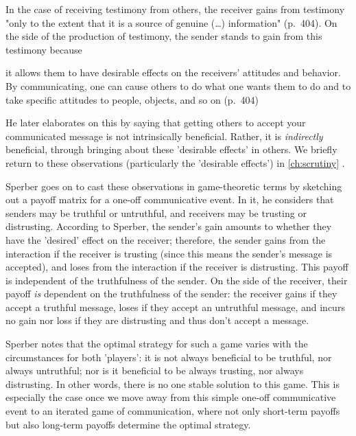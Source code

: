 In the case of receiving testimony from others, the receiver gains from testimony "only to the extent that it is a source of genuine (\ldots) information" (p.~404).
On the side of the production of testimony, the sender stands to gain from this testimony because
\begin{quoting}
    it allows them to have desirable effects on the receivers' attitudes and behavior. By communicating, one can cause others to do what one wants them to do and to take specific attitudes to people, objects, and so on
    \hfill (p.~404)
\end{quoting}
He later elaborates on this by saying that getting others to accept your communicated message is not intrinsically beneficial. Rather, it is \emph{indirectly} beneficial, through bringing about these 'desirable effects' in others.
We briefly return to these observations (particularly the 'desirable effects') in \cref{ch:scrutiny} .

Sperber goes on to cast these observations in game-theoretic terms by sketching out a payoff matrix for a one-off communicative event. In it, he considers that senders may be truthful or untruthful, and receivers may be trusting or distrusting. According to Sperber, the sender's gain amounts to whether they have the 'desired' effect on the receiver; therefore, the sender gains from the interaction if the receiver is trusting (since this means the sender's message is accepted), and loses from the interaction if the receiver is distrusting. This payoff is independent of the truthfulness of the sender. On the side of the receiver, their payoff \emph{is} dependent on the truthfulness of the sender: the receiver gains if they accept a truthful message, loses if they accept an untruthful message, and incurs no gain nor loss if they are distrusting and thus don't accept a message.

Sperber notes that the optimal strategy for such a game varies with the circumstances for both 'players': it is not always beneficial to be truthful, nor always untruthful; nor is it beneficial to be always trusting, nor always distrusting. In other words, there is no one stable solution to this game.
This is especially the case once we move away from this simple one-off communicative event to an iterated game of communication, where not only short-term payoffs but also long-term payoffs determine the optimal strategy.

